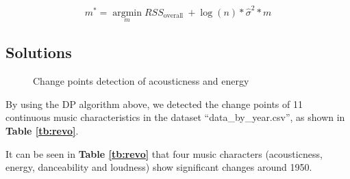 \documentclass[12pt]{article}  %
\begin{document}
	\begin{equation}
		m^{*}=\underset{m}{\operatorname{argmin}} R S S_{\text {overall }}+\log (n) * \widehat{\sigma}^{2} * m
	\end{equation}
	
	\subsection{Solutions}
	
	\begin{figure}[htbp]
		\centering    
		\caption{Change points detection of acousticness and energy}		%
		\label{Fig:cp}									%
	\end{figure}
	
	
	
	By using the DP algorithm above, we detected the change points of 11 continuous music
	characteristics in the dataset “data\_by\_year.csv”, as shown in \textbf{Table \ref{tb:revo}}.
	
	It can be seen in \textbf{Table \ref{tb:revo}} that four music characters (acousticness, energy, danceability and loudness) show significant changes around 1950.
	
\end{document}
